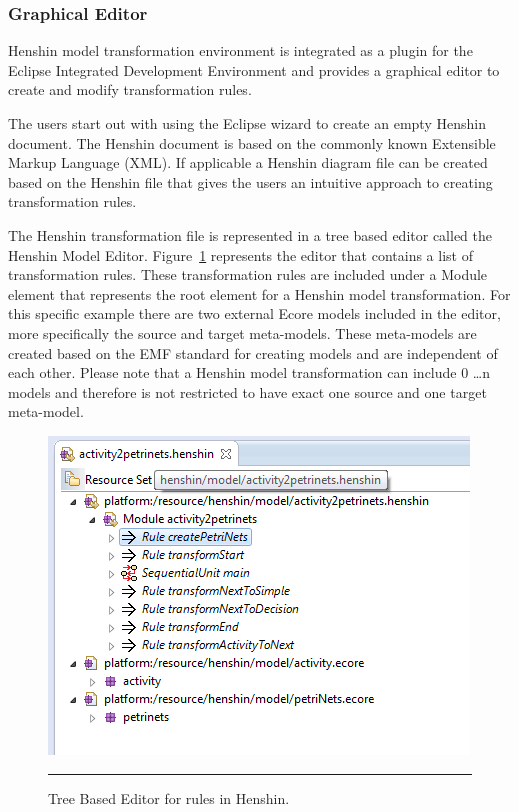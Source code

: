 \subsubsection*{Graphical Editor}
Henshin model transformation environment is integrated as a plugin for the
Eclipse Integrated Development Environment\cite{Eclipse} and provides a
graphical editor to create and modify transformation rules. 

The users start out with using the Eclipse wizard to create an empty Henshin
document. The Henshin document is based on the commonly known Extensible Markup
Language (XML)\cite{XML}. If applicable a Henshin diagram file can be created
based on the Henshin file that gives the users an intuitive approach to
creating transformation rules.

The Henshin transformation file is represented in a tree based editor called
the Henshin Model Editor. Figure~\ref{fig:Henshin_TreeEditor} represents the
editor that contains a list of transformation rules. These transformation rules
are included under a Module element that represents the root element for a
Henshin model transformation. For this specific example there are two external
Ecore models included in the editor, more specifically the source and target
meta-models. These meta-models are created based on the EMF standard for
creating models and are independent of each other. Please note that a Henshin
model transformation can include 0 \ldots n models and therefore is not
restricted to have exact one source and one target meta-model.

\begin{figure}[H]
	\centering
	\includegraphics[scale=0.7]{figures/Henshin_TreeEdtiro.png}
	\rule{35em}{0.5pt}
	\caption[The Henshin Model Editor]
	{Tree Based Editor for rules in Henshin.}
	\label{fig:Henshin_TreeEditor}
\end{figure}

